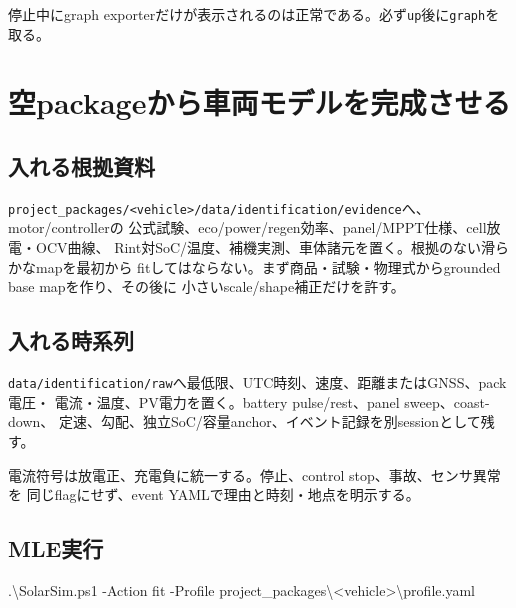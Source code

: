 \documentclass[
  japanese,
  a4paper,
]{article}
\newenvironment{Shaded}{}{}
\newcommand{\FunctionTok}[1]{\textcolor[rgb]{0.02,0.16,0.49}{#1}}
\newcommand{\NormalTok}[1]{#1}
\newcommand{\OperatorTok}[1]{\textcolor[rgb]{0.40,0.40,0.40}{#1}}
\begin{document}
停止中にgraph
exporterだけが表示されるのは正常である。必ず\texttt{up}後に\texttt{graph}を取る。

\section{空packageから車両モデルを完成させる}\label{ux7a7apackageux304bux3089ux8ecaux4e21ux30e2ux30c7ux30ebux3092ux5b8cux6210ux3055ux305bux308b}

\subsection{入れる根拠資料}\label{ux5165ux308cux308bux6839ux62e0ux8cc7ux6599}

\texttt{project\_packages/\textless{}vehicle\textgreater{}/data/identification/evidence}へ、motor/controllerの
公式試験、eco/power/regen効率、panel/MPPT仕様、cell放電・OCV曲線、
Rint対SoC/温度、補機実測、車体諸元を置く。根拠のない滑らかなmapを最初から
fitしてはならない。まず商品・試験・物理式からgrounded base
mapを作り、その後に 小さいscale/shape補正だけを許す。

\subsection{入れる時系列}\label{ux5165ux308cux308bux6642ux7cfbux5217}

\texttt{data/identification/raw}へ最低限、UTC時刻、速度、距離またはGNSS、pack電圧・
電流・温度、PV電力を置く。battery pulse/rest、panel sweep、coast-down、
定速、勾配、独立SoC/容量anchor、イベント記録を別sessionとして残す。

電流符号は放電正、充電負に統一する。停止、control
stop、事故、センサ異常を 同じflagにせず、event
YAMLで理由と時刻・地点を明示する。

\subsection{MLE実行}\label{mleux5b9fux884c}

\begin{Shaded}
\begin{Highlighting}[]
\OperatorTok{.}\NormalTok{\textbackslash{}SolarSim}\OperatorTok{.}\FunctionTok{ps1} \OperatorTok{{-}}\NormalTok{Action fit }\OperatorTok{{-}}\NormalTok{Profile project\_packages\textbackslash{}}\OperatorTok{\textless{}}\NormalTok{vehicle}\OperatorTok{\textgreater{}}\NormalTok{\textbackslash{}profile}\OperatorTok{.}\FunctionTok{yaml}
\end{Highlighting}
\end{Shaded}
\end{document}
